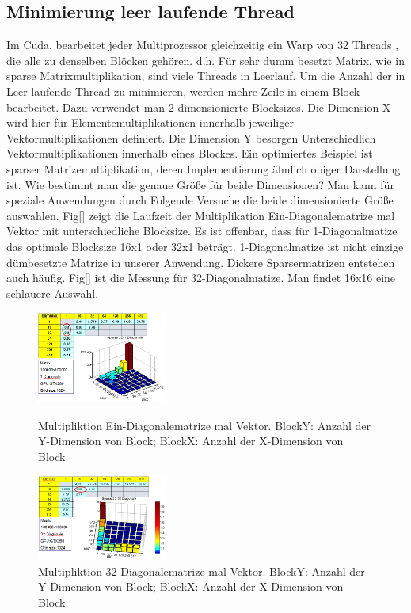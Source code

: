 \subsection{Minimierung leer laufende Thread}

Im Cuda, bearbeitet jeder Multiprozessor gleichzeitig ein Warp von 32 Threads \cite{cudapg}, die alle zu denselben Blöcken gehören. d.h. Für sehr dumm besetzt Matrix, wie in sparse Matrixmultiplikation, sind viele Threads in Leerlauf. Um die Anzahl der in Leer laufende Thread zu minimieren, werden mehre Zeile in einem Block bearbeitet. Dazu verwendet man 2 dimensionierte Blocksizes. Die Dimension X wird hier für Elementemultiplikationen innerhalb jeweiliger Vektormultiplikationen definiert. Die Dimension Y besorgen Unterschiedlich Vektormultiplikationen innerhalb eines Blockes. Ein optimiertes Beispiel ist sparser Matrizemultiplikation, deren Implementierung ähnlich obiger Darstellung ist. Wie bestimmt man die genaue Größe für beide Dimensionen?  Man kann für speziale Anwendungen durch Folgende Versuche die beide dimensionierte Größe auswahlen. Fig[] zeigt die Laufzeit der Multiplikation Ein-Diagonalematrize mal Vektor mit unterschiedliche Blocksize. Es ist offenbar, dass für 1-Diagonalmatize das optimale Blocksize 16x1 oder 32x1 beträgt. 1-Diagonalmatize ist nicht einzige dümbesetzte Matrize in unserer Anwendung. Dickere Sparsermatrizen entstehen auch häufig. Fig[] ist die Messung für 32-Diagonalmatize. Man findet 16x16 eine schlauere Auswahl.


\begin{figure}[htbp]

	\includegraphics[width=1.7in]{../xby/pic//einDiagonal}
	\caption{Multipliktion Ein-Diagonalematrize mal Vektor. BlockY: Anzahl der Y-Dimension von Block; BlockX: Anzahl der X-Dimension von Block}
	\includegraphics[width=1.7in]{../xby/pic//moreDiagonal}
	\caption{Multipliktion 32-Diagonalematrize mal Vektor. BlockY: Anzahl der Y-Dimension von Block; BlockX: Anzahl der X-Dimension von Block.}
\end{figure}